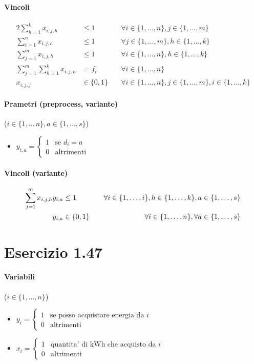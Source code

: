 \documentclass{article}
\begin{document}
\paragraph{Vincoli}
\begin{alignat}{2}
  \sum_{h=1}^k x_{i,j,h} &\leq 1 &\forall i \in \{1,\ldots,n\}, j \in \{1,\ldots,m\}\\
  \sum_{i=1}^n x_{i,j,h} &\leq 1 &\forall j \in \{1,\ldots,m\}, h \in \{1,\ldots,k\}\\
  \sum_{j=1}^m x_{i,j,h} &\leq 1 &\forall i \in \{1,\ldots,n\}, h \in \{1,\ldots,k\}\\
  \sum_{j=1}^m \sum_{h = 1}^k x_{i,j,h} &= f_i &\forall i \in \{1,\ldots,n\}\\
  x_{i,j,j} &\in \{0,1\} \quad &\forall i \in \{1,\ldots,n\}, j \in \{1,\ldots,m\}, i \in \{1,\ldots,k\}
\end{alignat}

\paragraph{Prametri (preprocess, variante)} ($i \in \{1,\ldots\,n\}, a \in \{1,\ldots,s\}$)
\begin{itemize}
  \item $y_{i,a} = \begin{cases}
    1 &\text{se }d_i = a\\
    0 &\text{altrimenti}
  \end{cases}$
\end{itemize}

\paragraph{Vincoli (variante)}
\begin{alignat}{2}
  \setcounter{equation}{5}
  \sum_{j=1}^m x_{i,j,h} y_{i,a} &\leq 1 &\forall i \in \{1,\ldots,i\}, h \in \{1,\ldots, k\}, a \in \{1,\ldots,s\}\\
  y_{i,a} &\in \{0,1\} \quad &\forall i \in \{1,\ldots,n\}, \forall a \in \{1,\ldots,s\}
\end{alignat}

\pagebreak
\section{Esercizio 1.47}

\paragraph{Variabili} ($i \in \{1,\ldots,n\}$)
\begin{itemize}
  \item $y_i = \begin{cases}
    1 &\text{se posso acquistare energia da }i\\
    0 &\text{altrimenti}
  \end{cases}$
  \item $x_i = \begin{cases}
    1 &\text{quantita' di kWh che acquisto da }i\\
    0 &\text{altrimenti}
  \end{cases}$
\end{itemize}
\end{document}
